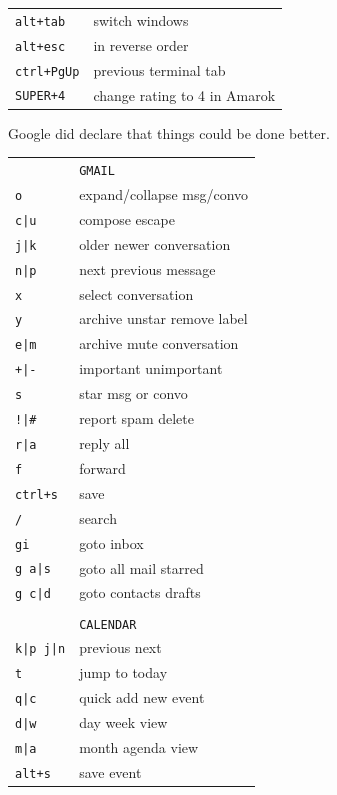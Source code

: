 \documentclass[a4paper,12pt]{article}
\begin{document}
\begin{multicols}{2}
\begin{tabular}{ll}
\texttt{alt+tab}&switch windows\\
\texttt{alt+esc}&in reverse order\\
\texttt{ctrl+PgUp}&previous terminal tab\\
\texttt{SUPER+4}&change rating to 4 in Amarok\\
\end{tabular}
\vfill
\bigskip
Google did declare that things could be done better.

\bigskip

\begin{tabular}{ll}
&\texttt{GMAIL}\\
\texttt{o}&expand/collapse msg/convo\\
\texttt{c|u}&compose \textbar{} escape\\
\texttt{j|k}&older \textbar{} newer conversation\\
\texttt{n|p}&next \textbar{} previous message\\
\texttt{x}&select conversation\\
\texttt{y}&archive \textbar{} unstar \textbar{} remove label\\
\texttt{e|m}&archive \textbar{} mute conversation\\
\texttt{+|-}&important \textbar{} unimportant\\
\texttt{s}&star msg or convo\\ 
\texttt{!|\#}&report spam \textbar{} delete\\ 
\texttt{r|a}&reply \textbar{} all\\ 
\texttt{f}&forward\\ 
\texttt{ctrl+s}&save\\
\texttt{/}&search\\ 
\texttt{gi}&goto inbox\\
\texttt{g a|s}&goto all mail \textbar{} starred\\ 
\texttt{g c|d}&goto contacts \textbar{} drafts\\ 
&\\
&\texttt{CALENDAR}\\
\texttt{k|p j|n}&previous next\\
\texttt{t}&jump to today\\
\texttt{q|c}&quick add \textbar{} new event\\
\texttt{d|w}&day \textbar{} week view\\
\texttt{m|a}&month \textbar{} agenda view\\
\texttt{alt+s}&save event\\

\end{tabular}
\end{multicols}
\end{document}
